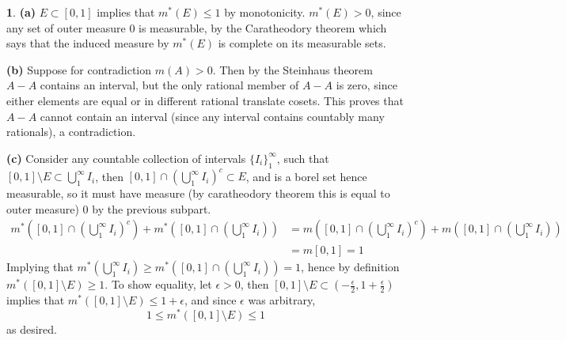 \documentclass[10.5pt]{article}
\theoremstyle{definition}
\newtheorem{pb}{}
\newcommand{\set}[1]{\{#1\}}
\begin{document}
    \begin{pb}
        \textbf{(a)} \(E \subset [0,1]\) implies that \(m^*(E) \leq 1\) by monotonicity. \(m^*(E) > 0\), since any set of outer measure \(0\) is measurable, by the Caratheodory
        theorem which says that the induced measure by \(m^*(E)\) is complete on its measurable sets.

        \textbf{(b)} Suppose for contradiction \(m(A) > 0\). Then by the Steinhaus theorem \(A - A\) contains an interval, but the only rational member of \(A - A\)
        is zero, since either elements are equal or in different rational translate cosets. This proves that \(A - A\) cannot contain an interval
        (since any interval contains countably many rationals), a contradiction.

        \textbf{(c)} Consider any countable collection of intervals \(\set{I_i}_1^\infty\), such that \([0,1]\setminus E \subset \bigcup_1^\infty I_i\), then
        \([0,1]\cap(\bigcup_1^\infty I_i)^c \subset E\), and is a borel set hence measurable, so it must have measure (by caratheodory theorem this is equal to outer measure) \(0\) by the previous subpart.
        \begin{align*}
            m^*\left([0,1]\cap(\bigcup_1^\infty I_i)^c\right) + m^*\left([0,1]\cap(\bigcup_1^\infty I_i)\right) &= m\left([0,1]\cap(\bigcup_1^\infty I_i)^c\right) + m\left([0,1]\cap(\bigcup_1^\infty I_i)\right) \\
            &= m[0,1] = 1
        \end{align*}
        Implying that \(m^*\left(\bigcup_1^\infty I_i\right) \geq m^*\left([0,1]\cap(\bigcup_1^\infty I_i)\right) = 1\), hence by definition \(m^*([0,1] \setminus E) \geq 1\). To show equality, let \(\epsilon > 0\), then
        \([0,1] \setminus E \subset (-\frac{\epsilon}{2},1+\frac{\epsilon}{2})\) implies that \(m^*([0,1] \setminus E) \leq 1 + \epsilon\), and since \(\epsilon\) was arbitrary,
        \[1 \leq m^*([0,1] \setminus E) \leq 1\]
        as desired.
    \end{pb}
\end{document}
